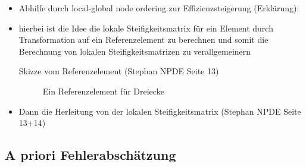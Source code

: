 \begin{itemize}
\item Abhilfe durch local-global node ordering zur Effizienzsteigerung (Erklärung):

\item hierbei ist die Idee die lokale Steifigkeitsmatrix für ein Element durch Transformation auf ein Referenzelement zu berechnen und somit die  Berechnung von lokalen Steifigkeitsmatrizen zu verallgemeinern

\item[Skizze] vom Referenzelement (Stephan NPDE Seite 13)

\begin{figure}[h]
\caption{Ein Referenzelement für Dreiecke}
\end{figure}

\item Dann die Herleitung von der lokalen Steifigkeitsmatrix (Stephan NPDE Seite 13+14)
\end{itemize}





\subsection{A priori Fehlerabschätzung}

